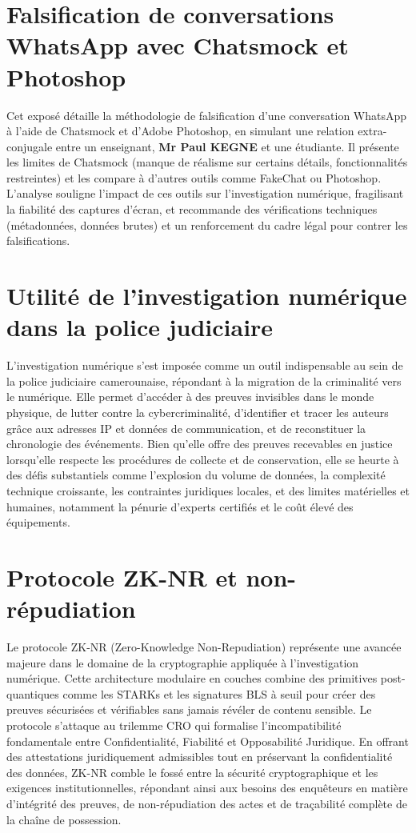 \documentclass[12pt, a4paper]{article}
\begin{document}
\section{Falsification de conversations WhatsApp avec Chatsmock et Photoshop}

Cet exposé détaille la méthodologie de falsification d'une conversation WhatsApp à l'aide de Chatsmock et d'Adobe Photoshop, en simulant une relation extra-conjugale entre un enseignant, \textbf{Mr Paul KEGNE} et une étudiante. Il présente les limites de Chatsmock (manque de réalisme sur certains détails, fonctionnalités restreintes) et les compare à d'autres outils comme FakeChat ou Photoshop. L'analyse souligne l'impact de ces outils sur l'investigation numérique, fragilisant la fiabilité des captures d'écran, et recommande des vérifications techniques (métadonnées, données brutes) et un renforcement du cadre légal pour contrer les falsifications.

\section{Utilité de l'investigation numérique dans la police judiciaire}

L’investigation numérique s'est imposée comme un outil indispensable au sein de la police judiciaire camerounaise, répondant à la migration de la criminalité vers le numérique. Elle permet d'accéder à des preuves invisibles dans le monde physique, de lutter contre la cybercriminalité, d'identifier et tracer les auteurs grâce aux adresses IP et données de communication, et de reconstituer la chronologie des événements. Bien qu'elle offre des preuves recevables en justice lorsqu'elle respecte les procédures de collecte et de conservation, elle se heurte à des défis substantiels comme l'explosion du volume de données, la complexité technique croissante, les contraintes juridiques locales, et des limites matérielles et humaines, notamment la pénurie d'experts certifiés et le coût élevé des équipements.

\section{Protocole ZK-NR et non-répudiation}

Le protocole ZK-NR (Zero-Knowledge Non-Repudiation) représente une avancée majeure dans le domaine de la cryptographie appliquée à l'investigation numérique. Cette architecture modulaire en couches combine des primitives post-quantiques comme les STARKs et les signatures BLS à seuil pour créer des preuves sécurisées et vérifiables sans jamais révéler de contenu sensible. Le protocole s'attaque au trilemme CRO qui formalise l'incompatibilité fondamentale entre Confidentialité, Fiabilité et Opposabilité Juridique. En offrant des attestations juridiquement admissibles tout en préservant la confidentialité des données, ZK-NR comble le fossé entre la sécurité cryptographique et les exigences institutionnelles, répondant ainsi aux besoins des enquêteurs en matière d'intégrité des preuves, de non-répudiation des actes et de traçabilité complète de la chaîne de possession.
\end{document}
